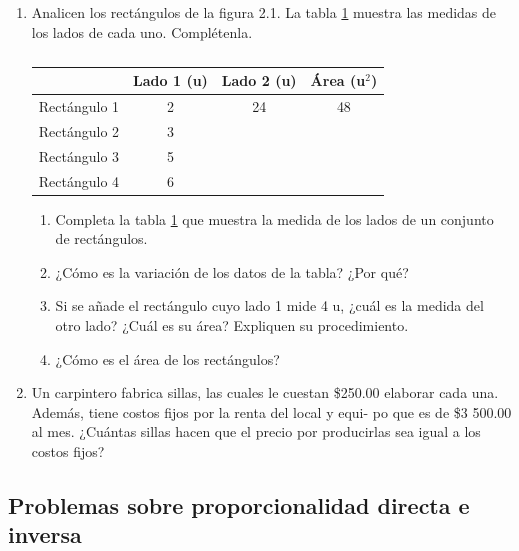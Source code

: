 \documentclass[11pt]{book}
\begin{document}
\begin{enumerate}
\begin{enumerate}
          \item Analicen los rectángulos de la figura 2.1. La tabla \ref{tab:rectangulos} muestra las medidas de los lados de cada uno. Complétenla.
                \begin{table}[!h]
                  \label{tab:rectangulos}
                  \centering
                  \begin{tabular}{|l|c|c|c|}
                    \hline
                                 & Lado 1 (u) & Lado 2 (u) & Área (u$^2$) \\
                    \hline
                    Rectángulo 1 & 2          & 24         & 48           \\
                    Rectángulo 2 & 3          &            &              \\
                    Rectángulo 3 & 5          &            &              \\
                    Rectángulo 4 & 6          &            &              \\
                    \hline
                  \end{tabular}
                  \caption{}
                \end{table}
                \begin{enumerate}
                  \item Completa la tabla \ref{tab:rectangulos} que muestra la medida de los lados de un conjunto de rect\'angulos.
                  \item ¿Cómo es la variación de los datos de la tabla? ¿Por qué?
                  \item Si se añade el rectángulo cuyo lado 1 mide 4 u, ¿cuál es la medida del otro lado? ¿Cuál es su área? Expliquen su procedimiento.
                  \item ¿Cómo es el área de los rectángulos?
                \end{enumerate}

          \item Un carpintero fabrica sillas, las cuales le cuestan \$250.00 elaborar
                cada una. Además, tiene costos fijos por la renta del local y equi-
                po que es de \$3 500.00 al mes. ¿Cuántas sillas hacen que el precio
                por producirlas sea igual a los costos fijos?
        \end{enumerate}
\end{enumerate}
\subsection{Problemas sobre proporcionalidad directa e inversa}
\end{document}
